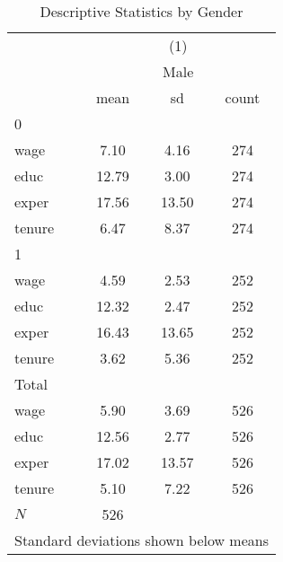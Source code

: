\begin{table}[htbp]\centering
\def\sym#1{\ifmmode^{#1}\else\(^{#1}\)\fi}
\caption{Descriptive Statistics by Gender}
\begin{tabular}{l*{1}{ccc}}
\toprule
            &\multicolumn{3}{c}{(1)}               \\
            &\multicolumn{3}{c}{Male}              \\
            &        mean&          sd&       count\\
\midrule
0           &            &            &            \\
wage        &        7.10&        4.16&         274\\
educ        &       12.79&        3.00&         274\\
exper       &       17.56&       13.50&         274\\
tenure      &        6.47&        8.37&         274\\
\midrule
1           &            &            &            \\
wage        &        4.59&        2.53&         252\\
educ        &       12.32&        2.47&         252\\
exper       &       16.43&       13.65&         252\\
tenure      &        3.62&        5.36&         252\\
\midrule
Total       &            &            &            \\
wage        &        5.90&        3.69&         526\\
educ        &       12.56&        2.77&         526\\
exper       &       17.02&       13.57&         526\\
tenure      &        5.10&        7.22&         526\\
\midrule
\(N\)       &         526&            &            \\
\bottomrule
\multicolumn{4}{l}{\footnotesize Standard deviations shown below means}\\
\end{tabular}
\end{table}
